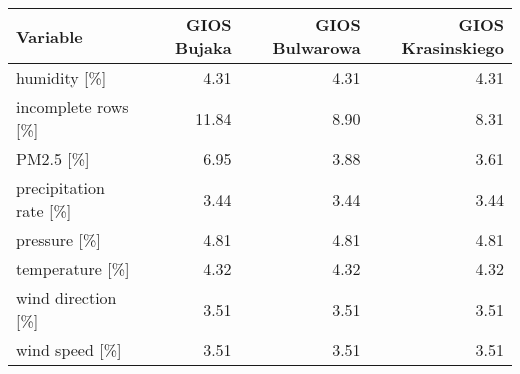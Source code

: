 \begin{table}[ht]
\centering
\begin{tabular}{lrrr}
  \toprule
Variable & GIOS Bujaka & GIOS Bulwarowa & GIOS Krasinskiego \\ 
  \midrule
humidity [\%] & 4.31 & 4.31 & 4.31 \\ 
  incomplete rows [\%] & 11.84 & 8.90 & 8.31 \\ 
  PM2.5 [\%] & 6.95 & 3.88 & 3.61 \\ 
  precipitation rate [\%] & 3.44 & 3.44 & 3.44 \\ 
  pressure [\%] & 4.81 & 4.81 & 4.81 \\ 
  temperature [\%] & 4.32 & 4.32 & 4.32 \\ 
  wind direction [\%] & 3.51 & 3.51 & 3.51 \\ 
  wind speed [\%] & 3.51 & 3.51 & 3.51 \\ 
   \bottomrule
\end{tabular}
\end{table}
